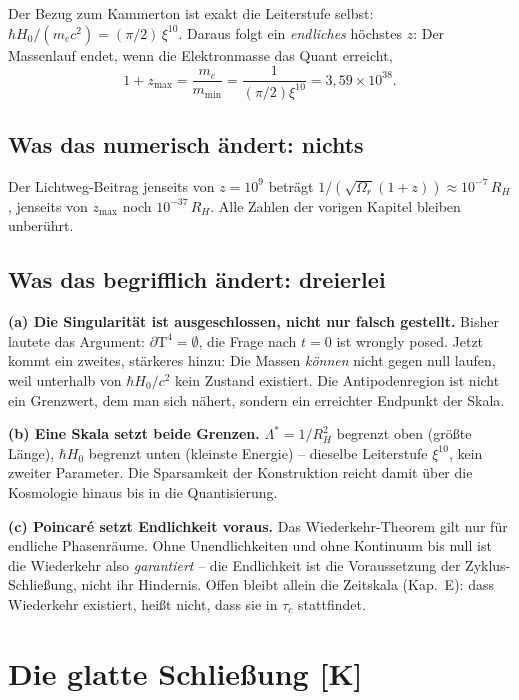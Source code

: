 \documentclass[11pt]{report}
\begin{document}
Der Bezug zum Kammerton ist exakt die Leiterstufe selbst:
$\hbar H_0/(m_ec^2) = (\pi/2)\,\xi^{10}$. Daraus folgt ein
\emph{endliches} höchstes $z$: Der Massenlauf endet, wenn die
Elektronmasse das Quant erreicht,
\begin{equation}
  1+z_\text{max} = \frac{m_e}{m_\text{min}}
  = \frac{1}{(\pi/2)\xi^{10}} = 3{,}59\times10^{38}.
\end{equation}

\section{Was das numerisch ändert: nichts}

Der Lichtweg-Beitrag jenseits von $z = 10^9$ beträgt
$1/(\sqrt{\Omega_r}(1{+}z)) \approx 10^{-7}\,R_H$, jenseits von
$z_\text{max}$ noch $10^{-37}\,R_H$. Alle Zahlen der vorigen
Kapitel bleiben unberührt.

\section{Was das begrifflich ändert: dreierlei}

\textbf{(a) Die Singularität ist ausgeschlossen, nicht nur falsch
gestellt.} Bisher lautete das Argument: $\partial\text{T}^4 =
\emptyset$, die Frage nach $t=0$ ist wrongly posed. Jetzt kommt
ein zweites, stärkeres hinzu: Die Massen \emph{können} nicht
gegen null laufen, weil unterhalb von $\hbar H_0/c^2$ kein Zustand
existiert. Die Antipodenregion ist nicht ein Grenzwert, dem man
sich nähert, sondern ein erreichter Endpunkt der Skala.

\textbf{(b) Eine Skala setzt beide Grenzen.} $\Lambda^{*} =
1/R_H^2$ begrenzt oben (größte Länge), $\hbar H_0$ begrenzt unten
(kleinste Energie) -- dieselbe Leiterstufe $\xi^{10}$, kein
zweiter Parameter. Die Sparsamkeit der Konstruktion reicht damit
über die Kosmologie hinaus bis in die Quantisierung.

\textbf{(c) Poincaré setzt Endlichkeit voraus.} Das
Wiederkehr-Theorem gilt nur für endliche Phasenräume. Ohne
Unendlichkeiten und ohne Kontinuum bis null ist die
Wiederkehr also \emph{garantiert} -- die Endlichkeit ist die
Voraussetzung der Zyklus-Schließung, nicht ihr Hindernis. Offen
bleibt allein die Zeitskala (Kap.~E): dass Wiederkehr existiert,
heißt nicht, dass sie in $\tau_c$ stattfindet.

\chapter{Die glatte Schließung [K]}
\end{document}
